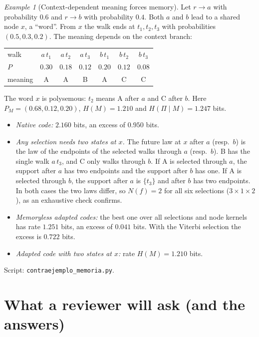 \documentclass[11pt]{article}
\theoremstyle{definition}
\theoremstyle{remark}
\newtheorem{example}{Example}
\begin{document}
\begin{example}[Context-dependent meaning forces memory]\label{ex:poly}
Let $r\to a$ with probability $0.6$ and $r\to b$ with probability $0.4$. Both $a$ and $b$ lead to a shared node $x$, a ``word''. From $x$ the walk ends at $t_1,t_2,t_3$ with probabilities $(0.5,0.3,0.2)$. The meaning depends on the context branch:
\begin{center}
\begin{tabular}{lcccccc}
\toprule
walk & $a\,t_1$ & $a\,t_2$ & $a\,t_3$ & $b\,t_1$ & $b\,t_2$ & $b\,t_3$\\
$P$ & $0.30$ & $0.18$ & $0.12$ & $0.20$ & $0.12$ & $0.08$\\
meaning & A & A & B & A & C & C\\
\bottomrule
\end{tabular}
\end{center}
The word $x$ is polysemous: $t_2$ means A after $a$ and C after $b$. Here $P_M=(0.68,0.12,0.20)$, $H(M)=1.210$ and $H(\Pi\mid M)=1.247$ bits.
\begin{itemize}
\item \emph{Native code:} $2.160$ bits, an excess of $0.950$ bits.
\item \emph{Any selection needs two states at $x$.} The future law at $x$ after $a$ (resp.\ $b$) is the law of the endpoints of the selected walks through $a$ (resp.\ $b$). B has the single walk $a\,t_3$, and C only walks through $b$. If A is selected through $a$, the support after $a$ has two endpoints and the support after $b$ has one. If A is selected through $b$, the support after $a$ is $\{t_3\}$ and after $b$ has two endpoints. In both cases the two laws differ, so $N(f)=2$ for all six selections ($3\times1\times2$), as an exhaustive check confirms.
\item \emph{Memoryless adapted codes:} the best one over all selections and node kernels has rate $1.251$ bits, an excess of $0.041$ bits. With the Viterbi selection the excess is $0.722$ bits.
\item \emph{Adapted code with two states at $x$:} rate $H(M)=1.210$ bits.
\end{itemize}
Script: \texttt{contraejemplo\_memoria.py}.
\end{example}

\section{What a reviewer will ask (and the answers)}
\end{document}
